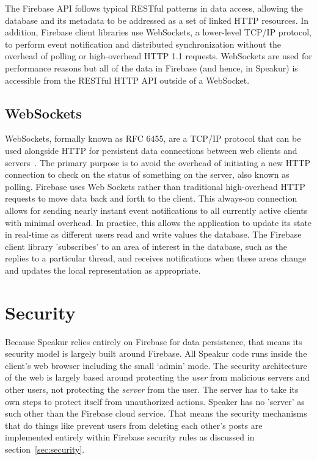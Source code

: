 The Firebase API follows typical RESTful patterns in data access, allowing the database and its metadata to be addressed as a set of linked HTTP resources.
In addition, Firebase client libraries use WebSockets, 
a lower-level TCP/IP protocol, 
to perform event notification and distributed synchronization without the overhead of polling or high-overhead HTTP 1.1 requests.
WebSockets are used for performance reasons but all of the data in Firebase (and hence, in Speakur) is accessible from the RESTful HTTP API outside of a WebSocket.

\subsection{WebSockets}
\label{sec:websockets}
WebSockets, formally known as RFC 6455, are a TCP/IP protocol that can be used alongside HTTP for persistent data connections between web clients and servers~\cite{mozillacontributors2015-a}.
The primary purpose is to avoid the overhead of initiating a new HTTP connection to check on the status of something on the server, also known as polling.
Firebase uses Web Sockets rather than traditional high-overhead HTTP requests to move data back and forth to the client.
This always-on connection allows for sending nearly instant event notifications to all currently active clients with minimal overhead.
In practice, this allows the application to update its state in real-time as different users read and write values the database.
The Firebase client library 'subscribes' to an area of interest in the database, such as the replies to a particular thread, and receives notifications when these areas change and updates the local representation as appropriate.

\section{Security}
Because Speakur relies entirely on Firebase for data persistence, that means its security model is largely built around Firebase. 
All Speakur code runs inside the client's web browser including the small `admin' mode.
The security architecture of the web is largely based around protecting the \textit{user} from malicious servers and other users, not protecting the \textit{server} from the user.
The server has to take its own steps to protect itself from unauthorized actions.
Speaker has no 'server' as such other than the Firebase cloud service.
That means the security mechanisms that do things like prevent users from deleting each other's posts are implemented entirely within Firebase security rules as discussed in section~\ref{sec:security}.

